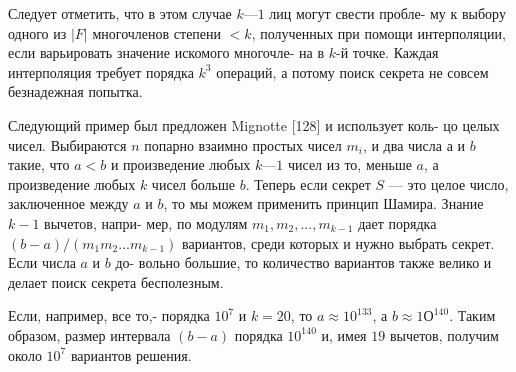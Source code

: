 \documentclass{../template/mai_book}
\begin{document}
Следует отметить, что в этом случае $k — 1$ лиц могут свести пробле­-\linebreak
му к выбору одного из $|F|$ многочленов степени $< k$, полученных при\linebreak
помощи интерполяции, если варьировать значение искомого многочле­-\linebreak
на в $k$-й точке. Каждая интерполяция требует порядка $k^3$ операций, а\linebreak
потому поиск секрета не совсем безнадежная попытка.

Следующий пример был предложен Mignotte [128] и использует коль­-\linebreak
цо целых чисел. Выбираются $n$ попарно взаимно простых чисел $m_i$,\linebreak
 и два числа $а$ и $b$ такие, что $a < b$ и произведение любых\linebreak
$k — 1$ чисел из то, меньше $a$, а произведение любых $k$ чисел больше $b$.\linebreak
Теперь если секрет $S$ — это целое число, заключенное между $a$ и $b$, то\linebreak
мы можем применить принцип Шамира. Знание $k - 1$ вычетов, напри­-\linebreak
мер, по модулям $m_1,m_2,...,m_{k-1}$ дает порядка $(b-a)/(m_1m_2...m_{k-1})$\linebreak
вариантов, среди которых и нужно выбрать секрет. Если числа $a$ и $b$ до­-\linebreak
вольно большие, то количество вариантов также велико и делает поиск\linebreak
секрета бесполезным.

Если, например, все то,- порядка $10^7$ и $k = 20$, то $a \approx 10^{133}$, а\linebreak
$b\approx1О^{140}$. Таким образом, размер интервала $(b-a)$ порядка $10^{140}$ и,\linebreak
имея $19$ вычетов, получим около $10^7$ вариантов решения.
\end{document}
